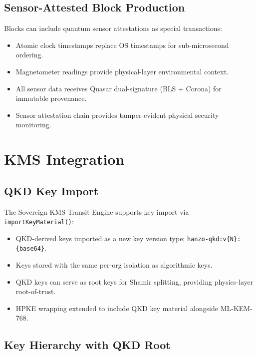\documentclass[11pt,letterpaper]{article}
\begin{document}
\subsection{Sensor-Attested Block Production}

Blocks can include quantum sensor attestations as special transactions:

\begin{itemize}
\item Atomic clock timestamps replace OS timestamps for sub-microsecond ordering.
\item Magnetometer readings provide physical-layer environmental context.
\item All sensor data receives Quasar dual-signature (BLS + Corona) for immutable provenance.
\item Sensor attestation chain provides tamper-evident physical security monitoring.
\end{itemize}

\section{KMS Integration}

\subsection{QKD Key Import}

The Sovereign KMS Transit Engine supports key import via \texttt{importKeyMaterial()}:

\begin{itemize}
\item QKD-derived keys imported as a new key version type: \texttt{hanzo-qkd:v\{N\}:\{base64\}}.
\item Keys stored with the same per-org isolation as algorithmic keys.
\item QKD keys can serve as root keys for Shamir splitting, providing physics-layer root-of-trust.
\item HPKE wrapping extended to include QKD key material alongside ML-KEM-768.
\end{itemize}

\subsection{Key Hierarchy with QKD Root}
\end{document}
